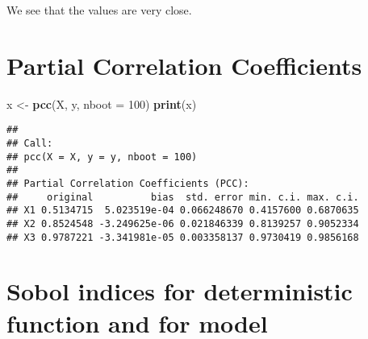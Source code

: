 \documentclass[
  11pt,
]{book}
\newenvironment{Shaded}{\begin{snugshade}}{\end{snugshade}}
\newcommand{\DataTypeTok}[1]{\textcolor[rgb]{0.13,0.29,0.53}{#1}}
\newcommand{\DecValTok}[1]{\textcolor[rgb]{0.00,0.00,0.81}{#1}}
\newcommand{\KeywordTok}[1]{\textcolor[rgb]{0.13,0.29,0.53}{\textbf{#1}}}
\newcommand{\NormalTok}[1]{#1}
\newcommand{\StringTok}[1]{\textcolor[rgb]{0.31,0.60,0.02}{#1}}
\begin{document}
We see that the values are very close.

\hypertarget{partial-correlation-coefficients}{%
\section{Partial Correlation Coefficients}\label{partial-correlation-coefficients}}

\begin{Shaded}
\begin{Highlighting}[]
\NormalTok{x <-}\StringTok{ }\KeywordTok{pcc}\NormalTok{(X, y, }\DataTypeTok{nboot =} \DecValTok{100}\NormalTok{)}
\KeywordTok{print}\NormalTok{(x)}
\end{Highlighting}
\end{Shaded}

\begin{verbatim}
## 
## Call:
## pcc(X = X, y = y, nboot = 100)
## 
## Partial Correlation Coefficients (PCC):
##     original          bias  std. error min. c.i. max. c.i.
## X1 0.5134715  5.023519e-04 0.066248670 0.4157600 0.6870635
## X2 0.8524548 -3.249625e-06 0.021846339 0.8139257 0.9052334
## X3 0.9787221 -3.341981e-05 0.003358137 0.9730419 0.9856168
\end{verbatim}

\hypertarget{sobol-indices-for-deterministic-function-and-for-model}{%
\section{Sobol indices for deterministic function and for model}\label{sobol-indices-for-deterministic-function-and-for-model}}
\end{document}
